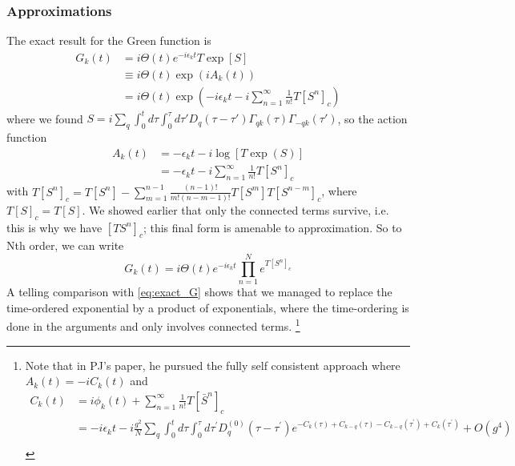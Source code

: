 \subsubsection{Approximations}
The exact result for the Green function is
\begin{align}
    G_k(t)&= i \Theta(t) e^{-i \epsilon_k t} T \exp \left[ S \right] \label{eq:exact_G} \\
&\equiv i \Theta(t) \exp \left( i A_k(t) \right) \\
&= i \Theta(t) \exp \left( -i \epsilon_k t - i \sum_{n=1}^{\infty} \frac{1}{n!} T\left[S^n\right]_c \right) 
\end{align}
where we found $S = i \sum_q \int_0^t d \tau \int_0^\tau d \tau' D_q(\tau - \tau') \Gamma_{q k}(\tau) \Gamma_{-q k}(\tau')$, so the action function 
\begin{align}
    A_k(t) &= -\epsilon_k t - i \log [T \exp (S)] \\
&= -\epsilon_k t - i \sum_{n=1}^{\infty} \frac{1}{n!} T\left[S^n\right]_c
\end{align}
with $T\left[S^n\right]_c = T\left[S^n\right]-\sum_{m=1}^{n-1} \frac{(n-1)!}{m!(n-m-1)!} T\left[S^{m}\right] T\left[S^{n-m}\right]_c$, where $T[S]_c=T[S]$.
We showed earlier that only the connected terms survive, i.e. this is why we have $ [T S^n ]_c$; 
this final form is amenable to approximation. So to Nth order, we can write
\begin{equation}
G_k(t) = i \Theta(t) e^{-i \epsilon_k t} \prod_{n=1}^N e^{T\left[S^n\right]_c}
\end{equation}
A telling comparison with \ref{eq:exact_G} shows that we managed to replace the time-ordered exponential by a product of exponentials, where the time-ordering is done in the arguments and only involves connected terms. \footnote{Note that in PJ's paper, he pursued the fully self consistent approach where $A_k(t)=-i C_k(t)$ and
\begin{align}
    C_k(t)&=i\phi_k(t) + \sum_{n=1}^{\infty} \frac{1}{n!} T\left[\bar{S}^n\right]_c \\
&= -i \epsilon_k t - i \frac{g^2}{N}\sum_q \int_0^t d \tau \int_0^\tau d \tau^{\prime} D_q^{(0)}\left(\tau-\tau^{\prime}\right) e^{-C_k(\tau)+C_{k-q}(\tau)-C_{k-q}\left(\tau^{\prime}\right)+C_k\left(\tau^{\prime}\right)} + O(g^4) \\
\label{a7}
\end{align}
}
